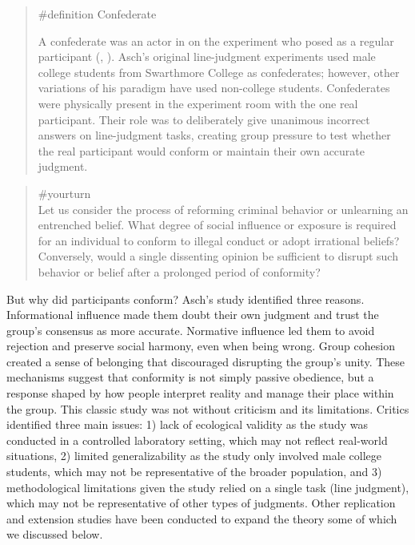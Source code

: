 \documentclass[
  letterpaper,
]{book}
\begin{document}
\begin{quote}
\label{def-confederate}{\#definition} Confederate

A confederate was an actor in on the experiment who posed as a regular
participant (,
). Asch's original line-judgment
experiments used male college students from Swarthmore College as
confederates; however, other variations of his paradigm have used
non-college students. Confederates were physically present in the
experiment room with the one real participant. Their role was to
deliberately give unanimous incorrect answers on line-judgment tasks,
creating group pressure to test whether the real participant would
conform or maintain their own accurate judgment.
\end{quote}

\begin{quote}
{\#yourturn}\\
Let us consider the process of reforming criminal behavior or unlearning
an entrenched belief. What degree of social influence or exposure is
required for an individual to conform to illegal conduct or adopt
irrational beliefs? Conversely, would a single dissenting opinion be
sufficient to disrupt such behavior or belief after a prolonged period
of conformity?
\end{quote}

But why did participants conform? Asch's study identified three reasons.
Informational influence made them doubt their own judgment and trust the
group's consensus as more accurate. Normative influence led them to
avoid rejection and preserve social harmony, even when being wrong.
Group cohesion created a sense of belonging that discouraged disrupting
the group's unity. These mechanisms suggest that conformity is not
simply passive obedience, but a response shaped by how people interpret
reality and manage their place within the group. This classic study was
not without criticism and its limitations. Critics identified three main
issues: 1) lack of ecological validity as the study was conducted in a
controlled laboratory setting, which may not reflect real-world
situations, 2) limited generalizability as the study only involved male
college students, which may not be representative of the broader
population, and 3) methodological limitations given the study relied on
a single task (line judgment), which may not be representative of other
types of judgments. Other replication and extension studies have been
conducted to expand the theory some of which we discussed below.
\end{document}
